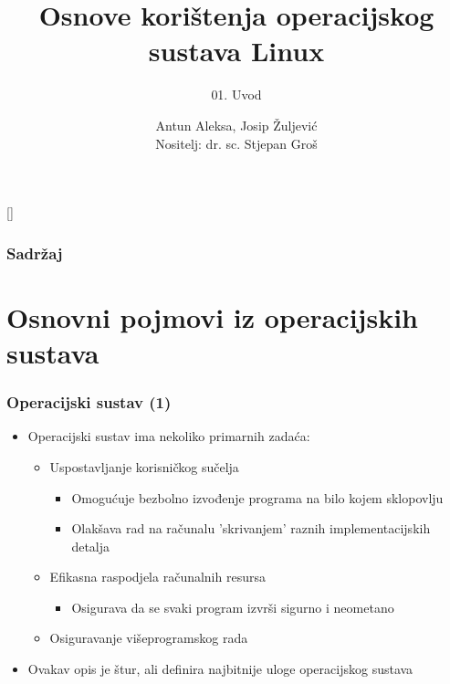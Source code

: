 \documentclass{beamer}
\title{Osnove korištenja operacijskog sustava Linux}
\subtitle{01. Uvod}
\author[Antun Aleksa, Josip Žuljević]{Antun Aleksa, Josip Žuljević\\{\small Nositelj: dr. sc. Stjepan Groš}}
\institute[FER]{Sveučilište u Zagrebu \\
				Fakultet elektrotehnike i računarstva}
\date{\todayiso}
\begin{document}
{
[] %

\begin{frame}
\maketitle
\end{frame}
}

\begin{frame}
\frametitle{Sadržaj}
\tableofcontents
\end{frame}

\section{Osnovni pojmovi iz operacijskih sustava}
\begin{frame}[t]
\frametitle{Operacijski sustav (1)}
\begin{itemize}
	\item Operacijski sustav ima nekoliko primarnih zadaća:
  \begin{itemize}
    \item Uspostavljanje korisničkog sučelja
    \begin{itemize}
      \item Omogućuje bezbolno izvođenje programa na bilo kojem sklopovlju
      \item Olakšava rad na računalu 'skrivanjem' raznih implementacijskih detalja
    \end{itemize}
    \item Efikasna raspodjela računalnih resursa
    \begin{itemize}
      \item Osigurava da se svaki program izvrši sigurno i neometano
    \end{itemize}
    \item Osiguravanje višeprogramskog rada
	\end{itemize}
  \item Ovakav opis je štur, ali definira najbitnije uloge
        operacijskog sustava
\end{itemize}
\end{frame}
\end{document}
